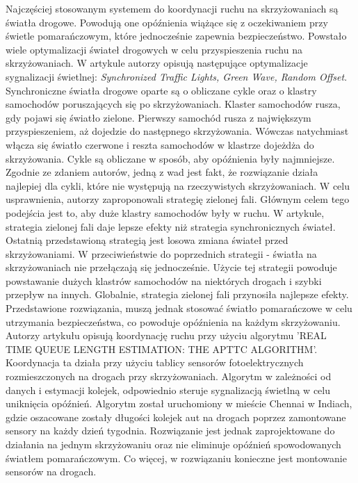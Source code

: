 \indent
Najczęściej stosowanym systemem do koordynacji ruchu na skrzyżowaniach są światła drogowe. Powodują one opóźnienia wiążące się z oczekiwaniem przy świetle pomarańczowym, które jednocześnie zapewnia bezpieczeństwo. Powstało wiele optymalizacji świateł drogowych w celu przyspieszenia ruchu na skrzyżowaniach.
\newline
\indent
W artykule \cite{brockfeld2001optimizing} autorzy opisują następujące optymalizacje sygnalizacji świetlnej: \textit{Synchronized Traffic Lights, Green Wave, Random Offset}. Synchroniczne światła drogowe oparte są o obliczane cykle oraz o klastry samochodów poruszających się po skrzyżowaniach. Klaster samochodów rusza, gdy pojawi się światło zielone. Pierwszy samochód rusza z największym przyspieszeniem, aż dojedzie do następnego skrzyżowania. Wówczas natychmiast włącza się światło czerwone i reszta samochodów w klastrze dojeżdża do skrzyżowania. Cykle są obliczane w sposób, aby opóźnienia były najmniejsze. Zgodnie ze zdaniem autorów, jedną z wad jest fakt, że rozwiązanie działa najlepiej dla cykli, które nie występują na rzeczywistych skrzyżowaniach. W celu usprawnienia, autorzy zaproponowali strategię zielonej fali. Głównym celem tego podejścia jest to, aby duże klastry samochodów były w ruchu. W artykule, strategia zielonej fali daje lepsze efekty niż strategia synchronicznych świateł. Ostatnią przedstawioną strategią jest losowa zmiana świateł przed skrzyżowaniami. W przeciwieństwie do poprzednich strategii - światła na skrzyżowaniach nie przełączają się jednocześnie. Użycie tej strategii powoduje powstawanie dużych klastrów samochodów na niektórych drogach i szybki przepływ na innych. Globalnie, strategia zielonej fali przynosiła najlepsze efekty. Przedstawione rozwiązania, muszą jednak stosować światło pomarańczowe w celu utrzymania bezpieczeństwa, co powoduje opóźnienia na każdym skrzyżowaniu.
\newline
\indent
Autorzy artykułu \cite{athmaraman2005adaptive} opisują koordynację ruchu przy użyciu algorytmu 'REAL TIME QUEUE LENGTH ESTIMATION: THE APTTC ALGORITHM'. Koordynacja ta działa przy użyciu tablicy sensorów fotoelektrycznych rozmieszczonych na drogach przy skrzyżowaniach. Algorytm w zależności od danych i estymacji kolejek, odpowiednio steruje sygnalizacją świetlną w celu uniknięcia opóźnień. Algorytm został uruchomiony w mieście Chennai w Indiach, gdzie oszacowane zostały długości kolejek aut na drogach poprzez zamontowane sensory na każdy dzień tygodnia. Rozwiązanie jest jednak zaprojektowane do działania na jednym skrzyżowaniu oraz nie eliminuje opóźnień spowodowanych światłem pomarańczowym. Co więcej, w rozwiązaniu konieczne jest montowanie sensorów na drogach.
